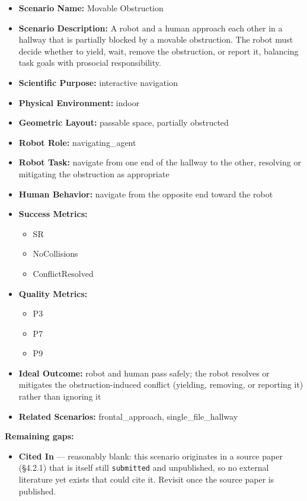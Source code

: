 \documentclass[utf8]{frontiers_suppmat} %
\providecommand{\tightlist}{%
  \setlength{\itemsep}{0pt}\setlength{\parskip}{0pt}}
\begin{document}
\begin{itemize}
\tightlist
\item
  \textbf{Scenario Name:} Movable Obstruction
\item
  \textbf{Scenario Description:} A robot and a human approach each other
  in a hallway that is partially blocked by a movable obstruction. The
  robot must decide whether to yield, wait, remove the obstruction, or
  report it, balancing task goals with prosocial responsibility.
\item
  \textbf{Scientific Purpose:} interactive navigation
\item
  \textbf{Physical Environment:} indoor
\item
  \textbf{Geometric Layout:} passable space, partially obstructed
\item
  \textbf{Robot Role:} navigating\_agent
\item
  \textbf{Robot Task:} navigate from one end of the hallway to the
  other, resolving or mitigating the obstruction as appropriate
\item
  \textbf{Human Behavior:} navigate from the opposite end toward the
  robot
\item
  \textbf{Success Metrics:}

  \begin{itemize}
  \tightlist
  \item
    SR
  \item
    NoCollisions
  \item
    ConflictResolved
  \end{itemize}
\item
  \textbf{Quality Metrics:}

  \begin{itemize}
  \tightlist
  \item
    P3
  \item
    P7
  \item
    P9
  \end{itemize}
\item
  \textbf{Ideal Outcome:} robot and human pass safely; the robot
  resolves or mitigates the obstruction-induced conflict (yielding,
  removing, or reporting it) rather than ignoring it
\item
  \textbf{Related Scenarios:} frontal\_approach, single\_file\_hallway
\end{itemize}

\textbf{Remaining gaps:}

\begin{itemize}
\tightlist
\item
  \textbf{Cited In} --- reasonably blank: this scenario originates in a
  source paper (§4.2.1) that is itself still \texttt{submitted} and
  unpublished, so no external literature yet exists that could cite it.
  Revisit once the source paper is published.
\end{itemize}
\end{document}
